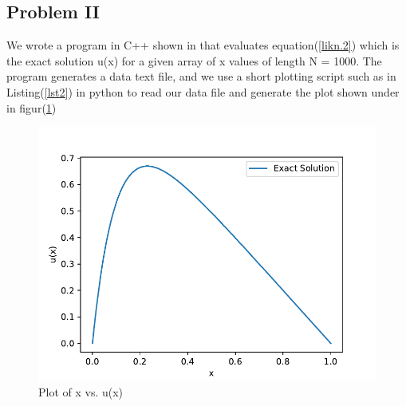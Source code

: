 \documentclass{article}
\begin{document}
\subsection*{Problem II}
\begin{flushleft}
We wrote a program in C++ shown in   that evaluates equation(\ref{likn.2})
which is the exact solution u(x) for a given array of x values of length 
N = 1000.
\vskip 0.01in
The program generates a data text file, and we use a short plotting script 
such as in Listing(\ref{lst2}) in python to read our data file and generate the plot shown under in figur(\ref{figur1})
\end{flushleft}
\begin{figure}[h]
    \centering %
    \includegraphics[scale=0.55]{Problem2/Exact_Solution_plot.pdf} %
    \caption{Plot of x vs. u(x)}
    \label{figur1}
\end{figure}
\pagebreak


\begin{lstlisting}[language=C++, label=lst2, caption=C++ program]
\end{lstlisting}

\pagebreak


\begin{lstlisting}[language=Python, caption=Python plot script]
\end{lstlisting}
\end{document}
